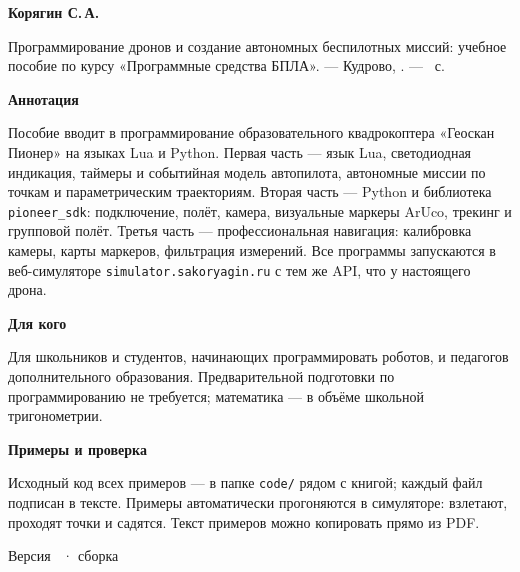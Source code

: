 \pagestyle{empty}
\sffamily
\setlength{\parindent}{0pt}
\vspace*{\fill}

{\large\bfseries\color{GeoskanDarkBlue} Корягин С.\,А.}\par
\vspace{4pt}
{\color{GeoskanDarkBlue} Программирование дронов и создание автономных беспилотных миссий: учебное пособие по курсу «Программные средства БПЛА». --- Кудрово, \the\year. --- \pageref{LastPage}~с.}\par
\vspace{1cm}

{\bfseries\color{GeoskanDarkBlue} Аннотация}\par
\vspace{4pt}
Пособие вводит в программирование образовательного квадрокоптера «Геоскан Пионер» на языках Lua и Python. Первая часть --- язык Lua, светодиодная индикация, таймеры и событийная модель автопилота, автономные миссии по точкам и параметрическим траекториям. Вторая часть --- Python и библиотека \texttt{pioneer\_sdk}: подключение, полёт, камера, визуальные маркеры ArUco, трекинг и групповой полёт. Третья часть --- профессиональная навигация: калибровка камеры, карты маркеров, фильтрация измерений. Все программы запускаются в веб-симуляторе \texttt{simulator.sakoryagin.ru} с тем же API, что у настоящего дрона.\par
\vspace{0.8cm}

{\bfseries\color{GeoskanDarkBlue} Для кого}\par
\vspace{4pt}
Для школьников и студентов, начинающих программировать роботов, и педагогов дополнительного образования. Предварительной подготовки по программированию не требуется; математика --- в объёме школьной тригонометрии.\par
\vspace{0.8cm}

{\bfseries\color{GeoskanDarkBlue} Примеры и проверка}\par
\vspace{4pt}
Исходный код всех примеров --- в папке \texttt{code/} рядом с книгой; каждый файл подписан в тексте. Примеры автоматически прогоняются в симуляторе: взлетают, проходят точки и садятся. Текст примеров можно копировать прямо из PDF.\par
\vspace{0.8cm}

{\footnotesize\color{GeoskanMuted} Версия \theversion\ · сборка \buildtimestamp\par}
\vspace*{\fill}
\clearpage
\pagestyle{scrheadings}
